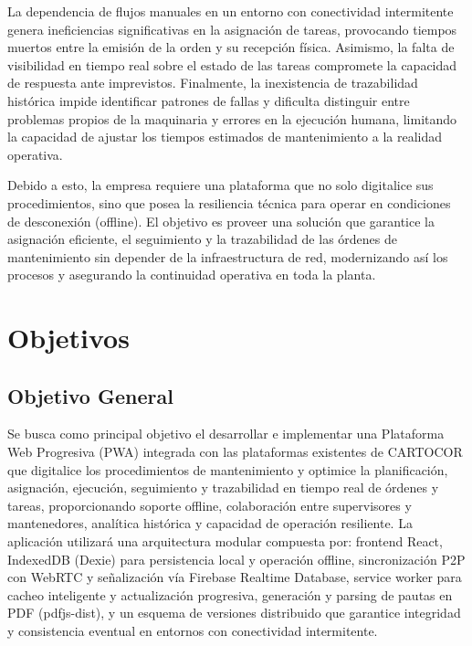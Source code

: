 \documentclass[10pt,a4paper]{report}
\begin{document}
La dependencia de flujos manuales en un entorno con conectividad intermitente genera ineficiencias significativas en la asignación de tareas, provocando tiempos muertos entre la emisión de la orden y su recepción física. Asimismo, la falta de visibilidad en tiempo real sobre el estado de las tareas compromete la capacidad de respuesta ante imprevistos. Finalmente, la inexistencia de trazabilidad histórica impide identificar patrones de fallas y dificulta distinguir entre problemas propios de la maquinaria y errores en la ejecución humana, limitando la capacidad de ajustar los tiempos estimados de mantenimiento a la realidad operativa.

Debido a esto, la empresa requiere una plataforma que no solo digitalice sus procedimientos, sino que posea la resiliencia técnica para operar en condiciones de desconexión (offline). El objetivo es proveer una solución que garantice la asignación eficiente, el seguimiento y la trazabilidad de las órdenes de mantenimiento sin depender de la infraestructura de red, modernizando así los procesos y asegurando la continuidad operativa en toda la planta.


\chapter*{Objetivos}

\section*{Objetivo General}
Se busca como principal objetivo el desarrollar e implementar una Plataforma Web Progresiva (PWA) integrada con las plataformas existentes de CARTOCOR que digitalice los procedimientos de mantenimiento y optimice la planificación, asignación, ejecución, seguimiento y trazabilidad en tiempo real de órdenes y tareas, proporcionando soporte offline, colaboración entre supervisores y mantenedores, analítica histórica y capacidad de operación resiliente.
La aplicación utilizará una arquitectura modular compuesta por: frontend React, IndexedDB (Dexie) para persistencia local y operación offline, sincronización P2P con WebRTC y señalización vía Firebase Realtime Database, service worker para cacheo inteligente y actualización progresiva, generación y parsing de pautas en PDF (pdfjs-dist), y un esquema de versiones distribuido que garantice integridad y consistencia eventual en entornos con conectividad intermitente.
\end{document}
